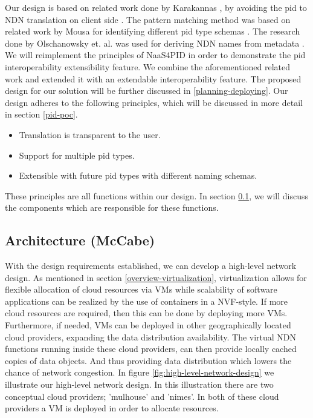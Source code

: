 Our design is based on related work done by Karakannas \cite{icn-bd}, by avoiding the \gls{pid} to NDN translation on client side \cite{icn-bd}. The pattern matching method was based on related work by Mousa for identifying different \gls{pid} type schemas \cite{ndn-app-aware}. The research done by Olschanowsky et. al. was used for deriving NDN names from metadata \cite{ndn-man}.
We will reimplement the principles of NaaS4PID in order to demonstrate the \gls{pid} interoperability extensibility feature.
We combine the aforementioned related work and extended it with an extendable interoperability feature. The proposed design for our solution will be further discussed in \ref{planning-deploying}.
Our design adheres to the following principles, which will be discussed in more detail in section \ref{pid-poc}.
 
\begin{itemize}
    \item{Translation is transparent to the user.}
    \item{Support for multiple \gls{pid} types.}
    \item{Extensible with future \gls{pid} types with different naming schemas.}
\end{itemize}

These principles are all functions within our design. In section \ref{planning-architecture}, we will discuss the components which are responsible for these functions.

\subsection{Architecture (McCabe)}
\label{planning-architecture}
With the design requirements established, we can develop a high-level network design. As mentioned in section \ref{overview-virtualization}, virtualization allows for flexible allocation of cloud resources via VMs while scalability of software applications can be realized by the use of containers in a NVF-style. If more cloud resources are required, then this can be done by deploying more VMs. Furthermore, if needed, VMs can be deployed in other geographically located cloud providers, expanding the data distribution availability. The virtual NDN functions running inside these cloud providers, can then provide locally cached copies of data objects. And thus providing data distribution which lowers the chance of network congestion. In figure \ref{fig:high-level-network-design} we illustrate our high-level network design. In this illustration there are two conceptual cloud providers; 'mulhouse' and 'nimes'. In both of these cloud providers a VM is deployed in order to allocate resources.

